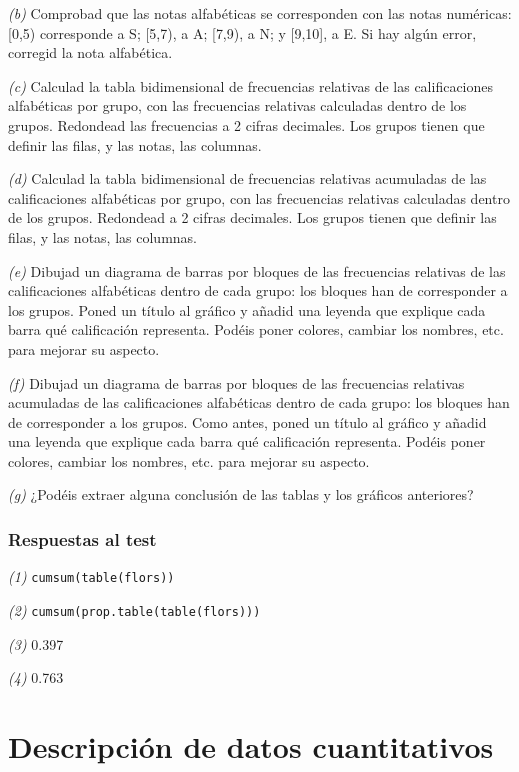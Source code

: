 \documentclass[
]{book}
\theoremstyle{definition}
\theoremstyle{definition}
\theoremstyle{definition}
\theoremstyle{remark}
\begin{document}
\emph{(b)} Comprobad que las notas alfabéticas se corresponden con las notas numéricas: {[}0,5) corresponde a S; {[}5,7), a A; {[}7,9), a N; y {[}9,10{]}, a E. Si hay algún error, corregid la nota alfabética.

\emph{(c)} Calculad la tabla bidimensional de frecuencias relativas de las calificaciones alfabéticas por grupo, con las frecuencias relativas calculadas dentro de los grupos. Redondead las frecuencias a 2 cifras decimales. Los grupos tienen que definir las filas, y las notas, las columnas.

\emph{(d)} Calculad la tabla bidimensional de frecuencias relativas acumuladas de las calificaciones alfabéticas por grupo, con las frecuencias relativas calculadas dentro de los grupos. Redondead a 2 cifras decimales. Los grupos tienen que definir las filas, y las notas, las columnas.

\emph{(e)} Dibujad un diagrama de barras por bloques de las frecuencias relativas
de las calificaciones alfabéticas dentro de cada grupo: los bloques han de corresponder a los grupos. Poned un título al gráfico y añadid una leyenda que explique cada barra qué calificación representa. Podéis poner colores, cambiar los nombres, etc. para mejorar su aspecto.

\emph{(f)} Dibujad un diagrama de barras por bloques de las frecuencias relativas acumuladas de las calificaciones alfabéticas dentro de cada grupo: los bloques han de corresponder a los grupos. Como antes, poned un título al gráfico y añadid una leyenda que explique cada barra qué calificación representa. Podéis poner colores, cambiar los nombres, etc. para mejorar su aspecto.

\emph{(g)} ¿Podéis extraer alguna conclusión de las tablas y los gráficos anteriores?

\hypertarget{respuestas-al-test-8}{%
\subsection*{Respuestas al test}\label{respuestas-al-test-8}}

\emph{(1)} \texttt{cumsum(table(flors))}

\emph{(2)} \texttt{cumsum(prop.table(table(flors)))}

\emph{(3)} 0.397

\emph{(4)} 0.763

\hypertarget{chap:quan}{%
\chapter{Descripción de datos cuantitativos}\label{chap:quan}}
\end{document}
